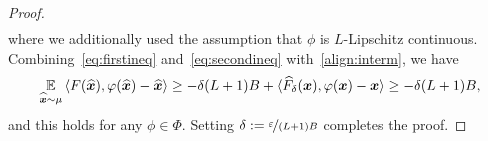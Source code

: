 \begin{proof}
\begin{align}
    \end{align}
    where we additionally used the assumption that $\phi$ is $L$-Lipschitz continuous. Combining~\eqref{eq:firstineq} and~\eqref{eq:secondineq} with~\eqref{align:interm}, we have
    \begin{equation}
        \E_{\hatvx \sim \mu} \ip{F(\hatvx), \phi(\hatvx) - \hatvx} \geq - \delta (L+1) B + \langle \hatF_\delta(\vx), \phi(\vx) - \vx \rangle \geq - \delta (L+1) B,
    \end{equation}
    and this holds for any $\phi \in \Phi$. Setting $\delta := \nicefrac{\varepsilon}{(L+1)B}$ completes the proof.
    \iffalse
    \begin{align}
        \E_{\vx\sim\mu} &\ip{F(\vx), \phi(\vx) - \vx} = \E_{\vx\sim\mu} \ip{F(\vx), \phi(\vx) - \vx - \phi(\vx^*) + \phi(\vx^*) + \vx^* - \vx^*} 
        \\
        &= \E_{\vx\sim\mu} \ip{F(\vx), \phi(\vx) - \phi(\vx^*)} + \E_{\vx\sim\mu} \ip{F(\vx), - \vx + \vx^*} + \E_{\vx\sim\mu} \ip{F(\vx), \phi(\vx^*) - \vx^*} 
        \\
        &\overset{(\dagger)}{\geq} - \sqrt{\E_{\vx\sim\mu} ||F(\vx)||^2} \sqrt{\E_{\vx\sim\mu} ||\phi(\vx) - \phi(\vx^*)||^2} - \sqrt{\E_{\vx\sim\mu} ||F(\vx)||^2} \sqrt{\E_{\vx\sim\mu} ||\vx^* - \vx||^2} + \E_{\vx\sim\mu} \ip{F(\vx), \phi(\vx^*) - \vx^*} 
        \\
        &\overset{(\star)}{\geq} - M L \delta - M \delta + \int_X \sum_{i=1}^n F_i(\vx) \cdot \qty( \phi_i(\vx^*) - \vx_i^* ) d\mu(\vx) = - M (L+1) \delta + \sum_{i=1}^n \qty( \phi_i(\vx^*) - \vx_i^* ) \int_X F_i(\vx) d\mu(\vx)
        \\
        &= - M (L+1) \delta + \ip{\int_X F_i(\vx) d\mu(\vx) \, \, , \, \, \phi(\vx^*) - \vx^*} 
        \\
        &= - M (L+1) \delta + \ip{\frac{1}{|\cB_{\delta}(\vx^*) \cap \cX|} \int_{\cB_{\delta}(\vx^*) \cap \cX} F(\vx) d\nu(\vx) \, \, , \, \, \phi(\vx^*) - \vx^*} = - M (L+1) \delta + \ip{\hatF_\delta(\vx^*), \phi(\vx^*) - \vx^*}
        \\
        &\geq - M (L+1) \delta + 0 = -\eps.
    \end{align}
    Here, we used the Cauchy-Schwarz inequality for integrals in $(\dagger)$, and the uniform Lipschitz continuity of $\Phi$ in $(\star)$ together with that $||F(\vx)|| \leq M$ because $F(\vx) \in \cX$. Therefore, $\mu$ forms an $\epsilon$-approximate solution to the $\Phi$-EVI problem.
    \fi
\end{proof}

